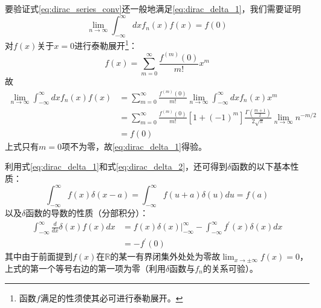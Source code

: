 \documentclass[main.tex]{subfiles}
\begin{document}
要验证式\eqref{eq:dirac_series_conv}还一般地满足\eqref{eq:dirac_delta_1}，我们需要证明
\[\lim_{n\to\infty}\int_{-\infty}^\infty dxf_n\left(x\right)f\left(x\right)=f\left(0\right)\]
对$f\left(x\right)$关于$x=0$进行泰勒展开\footnote{函数$f$满足的性须使其必可进行泰勒展开。}：
\[f\left(x\right)=\sum_{m=0}^\infty\frac{f^{\left(m\right)}\left(0\right)}{m!}x^m\]
故
\begin{align*}
    \lim_{n\to\infty}\int_{-\infty}^\infty dxf_n\left(x\right)f\left(x\right) & =\sum_{m=0}^\infty\frac{f^{\left(m\right)}\left(0\right)}{m!}\lim_{n\to\infty}\int_{-\infty}^\infty dxf_n\left(x\right)x^m                                                 \\
                                                                              & =\sum_{m=0}^\infty\frac{f^{\left(m\right)}\left(0\right)}{m!}\left[1+\left(-1\right)^m\right]\frac{\Gamma\left(\frac{m+1}{2}\right)}{2\sqrt{\pi}}\lim_{n\to\infty}n^{-m/2} \\
                                                                              & =f\left(0\right)
\end{align*}
上式只有$m=0$项不为零，故\eqref{eq:dirac_delta_1}得验。

利用式\eqref{eq:dirac_delta_1}和式\eqref{eq:dirac_delta_2}，还可得到$\delta$函数的以下基本性质：
\begin{equation}\label{eq:delta_offset}
    \int_{-\infty}^\infty f\left(x\right)\delta\left(x-a\right)=\int_{-\infty}^\infty f\left(u+a\right)\delta\left(u\right)du=f\left(a\right)
\end{equation}
以及$\delta$函数的导数的性质（分部积分）：
\begin{align}\label{eq:delta_derivative}
    \int_{-\infty}^\infty\frac{d}{dx}\delta\left(x\right)f\left(x\right)dx & =\left.f\left(x\right)\delta\left(x\right)\right|_{-\infty}^\infty-\int_{-\infty}^\infty f^\prime\left(x\right)\delta\left(x\right)dx\nonumber \\
                                                                           & =-f^\prime\left(0\right)
\end{align}
其中由于前面提到$f\left(x\right)$在$\mathbb{R}$的某一有界闭集外处处为零故$\lim_{x\to\pm\infty}f\left(x\right)=0$，上式的第一个等号右边的第一项为零（利用$\delta$函数与$f_n$的关系可验）。
\end{document}
